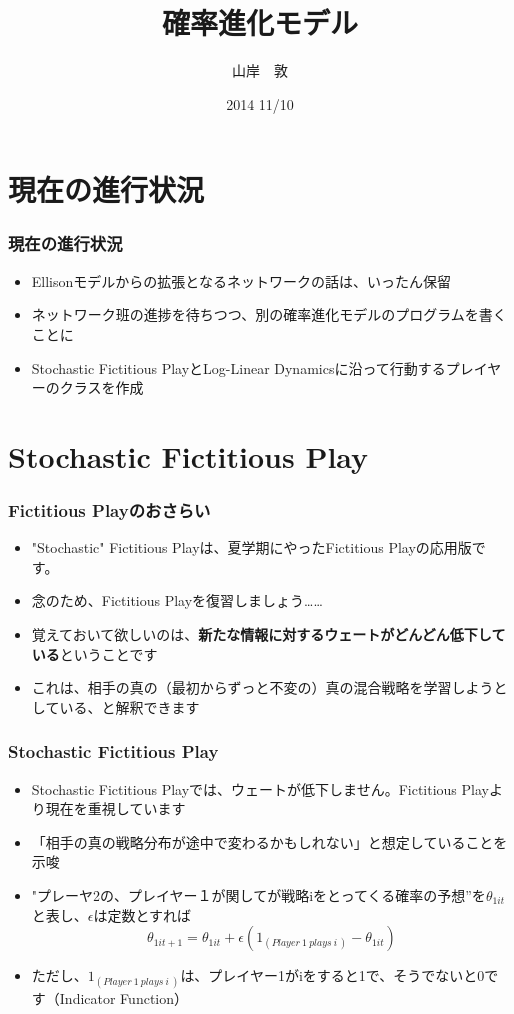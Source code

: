 \documentclass[dvipdfmx,fleqn]{beamer}
\title{確率進化モデル}
\author{山岸　敦}
\institute{東京大学経済学部３年・尾山ゼミ}
\date{2014 11/10}
\begin{document}
\frame{\titlepage}

\section{} %

\section{現在の進行状況}
\begin{frame}\frametitle{現在の進行状況}
\begin{itemize}\setlength{\parskip}{0.5em}
\item
Ellisonモデルからの拡張となるネットワークの話は、いったん保留
\item
ネットワーク班の進捗を待ちつつ、別の確率進化モデルのプログラムを書くことに
\item
Stochastic Fictitious PlayとLog-Linear Dynamicsに沿って行動するプレイヤーのクラスを作成
\end{itemize}
\end{frame}



\section{Stochastic Fictitious Play}
\begin{frame}
\frametitle{Fictitious Playのおさらい}
\begin{itemize}\setlength{\parskip}{0.5em}
\item
"Stochastic" Fictitious Playは、夏学期にやったFictitious Playの応用版です。
\item
念のため、Fictitious Playを復習しましょう……
\item
覚えておいて欲しいのは、{\bf 新たな情報に対するウェートがどんどん低下している}ということです
\item
これは、相手の真の（最初からずっと不変の）真の混合戦略を学習しようとしている、と解釈できます
\end{itemize}
\end{frame}

\begin{frame}
\frametitle{Stochastic Fictitious Play}
\begin{itemize}\setlength{\parskip}{0.5em}
\item
Stochastic Fictitious Playでは、ウェートが低下しません。Fictitious Playより現在を重視しています
\item
「相手の真の戦略分布が途中で変わるかもしれない」と想定していることを示唆
\item
"プレーヤ2の、プレイヤー１が関してが戦略iをとってくる確率の予想”を$\theta_{1it}$と表し、$\epsilon$は定数とすれば
\[
\theta_{1it+1} = \theta_{1it} + \epsilon(1_{(Player\:1\:plays\:i\,)} - \theta_{1it})
\]
\item
ただし、$1_{(Player\:1\:plays\:i\:)}$は、プレイヤー1がiをすると1で、そうでないと0です（Indicator Function）

\end{itemize}
\end{frame}
\end{document}
